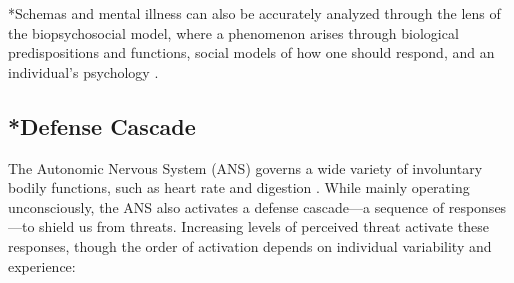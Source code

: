 \documentclass[12pt,letterpaper]{book}
\begin{document}
*Schemas and mental illness can also be accurately analyzed through the lens of the biopsychosocial model, where a phenomenon arises through biological predispositions and functions, social models of how one should respond, and an individual's psychology \cite{wadeBiopsychosocial}.
\subsection{*Defense Cascade}
The Autonomic Nervous System (ANS) governs a wide variety of involuntary bodily functions, such as heart rate and digestion \cite{kozlowskaDefenseCascade}. While mainly operating unconsciously, the ANS also activates a defense cascade—a sequence of responses—to shield us from threats. Increasing levels of perceived threat activate these responses, though the order of activation depends on individual variability and experience:
\end{document}

